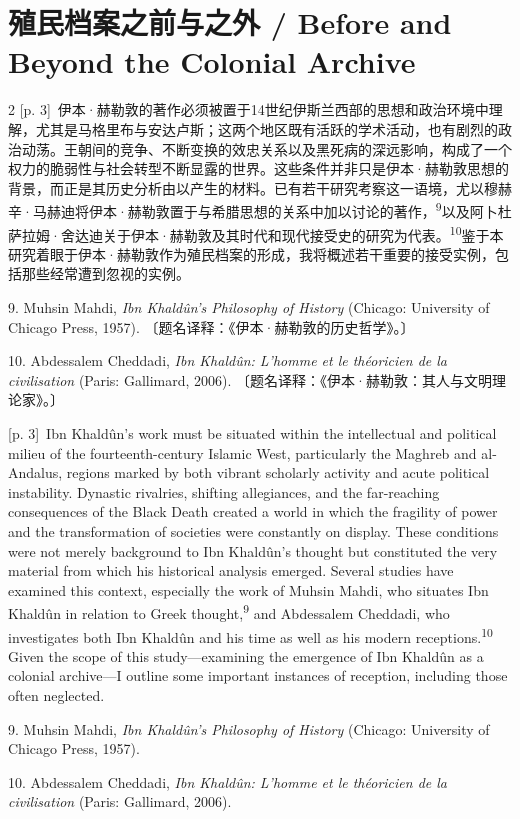 \documentclass[10pt,a4paper]{article}
\begin{document}
\section*{殖民档案之前与之外 / Before and Beyond the Colonial Archive}
\begin{paracol}{2}
{\scriptsize\color{gray} [p. 3]}\ 伊本·赫勒敦的著作必须被置于14世纪伊斯兰西部的思想和政治环境中理解，尤其是马格里布与安达卢斯；这两个地区既有活跃的学术活动，也有剧烈的政治动荡。王朝间的竞争、不断变换的效忠关系以及黑死病的深远影响，构成了一个权力的脆弱性与社会转型不断显露的世界。这些条件并非只是伊本·赫勒敦思想的背景，而正是其历史分析由以产生的材料。已有若干研究考察这一语境，尤以穆赫辛·马赫迪将伊本·赫勒敦置于与希腊思想的关系中加以讨论的著作，\nobreak\textsuperscript{9}以及阿卜杜萨拉姆·舍达迪关于伊本·赫勒敦及其时代和现代接受史的研究为代\mbox{表。\textsuperscript{10}}鉴于本研究着眼于伊本·赫勒敦作为殖民档案的形成，我将概述若干重要的接受实例，包括那些经常遭到忽视的实例。\par{\small 9. Muhsin Mahdi, \textit{Ibn Khaldûn’s Philosophy of History} (Chicago: University of Chicago Press, 1957). 〔题名译释：《伊本·赫勒敦的历史哲学》。〕\par}{\small 10. Abdessalem Cheddadi, \textit{Ibn Khaldûn: L’homme et le théoricien de la civilisation} (Paris: Gallimard, 2006). 〔题名译释：《伊本·赫勒敦：其人与文明理论家》。〕\par}
\switchcolumn
{\scriptsize\color{gray} [p. 3]}\ Ibn Khaldûn’s work must be situated within the intellectual and political milieu of the fourteenth-century Islamic West, particularly the Maghreb and al-Andalus, regions marked by both vibrant scholarly activity and acute political instability. Dynastic rivalries, shifting allegiances, and the far-reaching consequences of the Black Death created a world in which the fragility of power and the transformation of societies were constantly on display. These conditions were not merely background to Ibn Khaldûn’s thought but constituted the very material from which his historical analysis emerged. Several studies have examined this context, especially the work of Muhsin Mahdi, who situates Ibn Khaldûn in relation to Greek thought,\nobreak\textsuperscript{9} and Abdessalem Cheddadi, who investigates both Ibn Khaldûn and his time as well as his modern receptions.\nobreak\textsuperscript{10} Given the scope of this study—examining the emergence of Ibn Khaldûn as a colonial archive—I outline some important instances of reception, including those often neglected.\par{\small 9. Muhsin Mahdi, \textit{Ibn Khaldûn’s Philosophy of History} (Chicago: University of Chicago Press, 1957).\par}{\small 10. Abdessalem Cheddadi, \textit{Ibn Khaldûn: L’homme et le théoricien de la civilisation} (Paris: Gallimard, 2006).\par}

\end{paracol}
\end{document}
